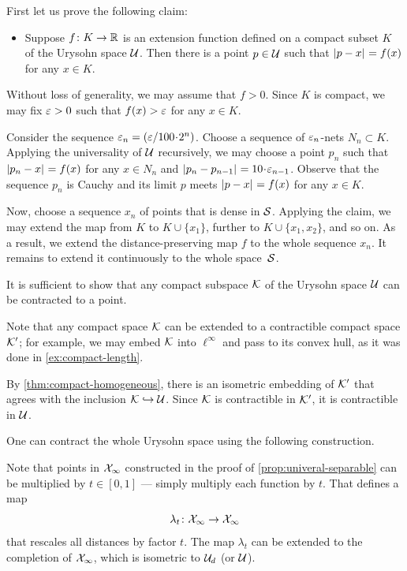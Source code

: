 First let us prove the following claim:

\begin{itemize}
\item 
Suppose $f\colon K\to\mathbb{R}$ is an extension function defined on a compact subset $K$ of the Urysohn space $\mathcal{U}$.
Then there is a point $p\in \mathcal{U}$ such that 
$\dist{p}{x}{}=f(x)$ for any $x\in K$.
\end{itemize}

Without loss of generality, we may assume that $f>0$.
Since $K$ is compact, we may fix $\varepsilon>0$ such that $f(x)>\varepsilon$ for any $x\in K$.

Consider the sequence $\eps_n=\tfrac\eps{100\cdot 2^n}$.
Choose a sequence of $\varepsilon_n$-nets $N_n\subset K$.
Applying the universality of $\mathcal{U}$ recursively, we may choose a point $p_n$ such that $\dist{p_n}{x}{}=f(x)$ for any $x\in N_n$ and $\dist{p_n}{p_{n-1}}{}\z=10\cdot\eps_{n-1}$.
Observe that the sequence $p_n$ is Cauchy and its limit $p$ meets 
$\dist{p}{x}{}=f(x)$ for any $x\in K$.

Now, choose a sequence $x_n$ of points that is dense in $\mathcal{S}$.
Applying the claim, we may extend the map from $K$ to $K\cup\{x_1\}$, further to $K\cup\{x_1,x_2\}$, and so on.
As a result, we extend the distance-preserving map $f$ to the whole sequence $x_n$.
It remains to extend it continuously to the whole space~$\mathcal{S}$.

It is sufficient to show that any compact subspace $\mathcal{K}$ of the Urysohn space $\mathcal{U}$ can be contracted to a point.

Note that any compact space $\mathcal{K}$ can be extended to a contractible compact space $\mathcal{K}'$; for example, we may embed $\mathcal{K}$ into $\ell^\infty$ and pass to its convex hull, as it was done in \ref{ex:compact-length}.

By \ref{thm:compact-homogeneous}, there is an isometric embedding of $\mathcal{K}'$ that agrees with the inclusion $\mathcal{K}\hookrightarrow\mathcal{U}$.
Since $\mathcal{K}$ is contractible in $\mathcal{K}'$, it is contractible in $\mathcal{U}$.

One can contract the whole Urysohn space using the following construction.

Note that points in $\mathcal{X}_\infty$ constructed in the proof of \ref{prop:univeral-separable} can be multiplied by $t\in [0,1]$ --- simply multiply each function by $t$.
That defines a map 
\[\lambda_t\colon\mathcal{X}_\infty\to \mathcal{X}_\infty\]
that rescales all distances by factor $t$.
The map $\lambda_t$ can be extended to the completion of $\mathcal{X}_\infty$, which is isometric to $\mathcal{U}_d$ (or $\mathcal{U}$).

